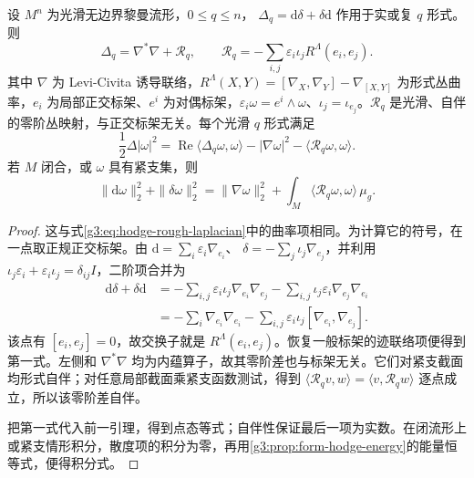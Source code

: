 \begin{theorem}[Weitzenböck 公式]\label{g3:thm:weitzenbock-forms}
	设 \(M^n\) 为光滑无边界黎曼流形，\(0\le q\le n\)，
	\(\Delta_q=\mathrm d\delta+\delta\mathrm d\) 作用于实或复 \(q\) 形式。则
	\begin{equation}\label{g3:eq:weitzenbock-forms}
		\Delta_q=\nabla^*\nabla+\mathcal R_q,\qquad
		\mathcal R_q=-\sum_{i,j}\varepsilon_i\iota_jR^\Lambda(e_i,e_j).
	\end{equation}
	其中 \(\nabla\) 为 Levi-Civita 诱导联络，\(R^\Lambda(X,Y)=[\nabla_X,\nabla_Y]-\nabla_{[X,Y]}\) 为形式丛曲率，\(e_i\) 为局部正交标架、\(e^i\) 为对偶标架，\(\varepsilon_i\omega=e^i\wedge\omega\)、\(\iota_j=\iota_{e_j}\)。\(\mathcal R_q\) 是光滑、自伴的零阶丛映射，与正交标架无关。每个光滑 \(q\) 形式满足
	\begin{equation}\label{g3:eq:bochner-form-pointwise}
		\frac12\Delta|\omega|^2
		=\operatorname{Re}\langle\Delta_q\omega,\omega\rangle
		  -|\nabla\omega|^2-\langle\mathcal R_q\omega,\omega\rangle.
	\end{equation}
	若 \(M\) 闭合，或 \(\omega\) 具有紧支集，则
	\begin{equation}\label{g3:eq:bochner-form-integrated}
		\|\mathrm d\omega\|_2^2+\|\delta\omega\|_2^2
		=\|\nabla\omega\|_2^2
		  +\int_M\langle\mathcal R_q\omega,\omega\rangle\,\mu_g.
	\end{equation}
\end{theorem}
\begin{proof}
	这与式\eqref{g3:eq:hodge-rough-laplacian}中的曲率项相同。为计算它的符号，在一点取正规正交标架。由
	\(\mathrm d=\sum_i\varepsilon_i\nabla_{e_i}\)、
	\(\delta=-\sum_j\iota_j\nabla_{e_j}\)，并利用
	\(\iota_j\varepsilon_i+\varepsilon_i\iota_j=\delta_{ij}I\)，二阶项合并为
	\[
		\begin{split}
		\mathrm d\delta+\delta\mathrm d
		&=-\sum_{i,j}\varepsilon_i\iota_j\nabla_{e_i}\nabla_{e_j}
		  -\sum_{i,j}\iota_j\varepsilon_i\nabla_{e_j}\nabla_{e_i}\\
		&=-\sum_i\nabla_{e_i}\nabla_{e_i}
		  -\sum_{i,j}\varepsilon_i\iota_j
		     [\nabla_{e_i},\nabla_{e_j}].
		\end{split}
	\]
	该点有 \([e_i,e_j]=0\)，故交换子就是 \(R^\Lambda(e_i,e_j)\)。恢复一般标架的迹联络项便得到第一式。左侧和 \(\nabla^*\nabla\) 均为内蕴算子，故其零阶差也与标架无关。它们对紧支截面均形式自伴；对任意局部截面乘紧支函数测试，得到
	\(\langle\mathcal R_q v,w\rangle=\langle v,\mathcal R_qw\rangle\)
	逐点成立，所以该零阶差自伴。

	把第一式代入前一引理，得到点态等式；自伴性保证最后一项为实数。在闭流形上或紧支情形积分，散度项的积分为零，再用\cref{g3:prop:form-hodge-energy}的能量恒等式，便得积分式。
\end{proof}

